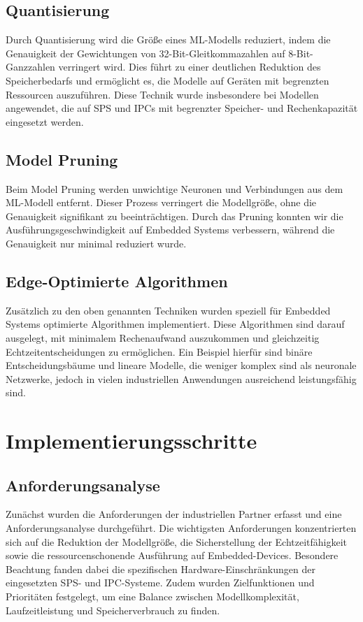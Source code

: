 \subsection{Quantisierung}
Durch Quantisierung wird die Größe eines ML-Modells reduziert, indem die Genauigkeit der Gewichtungen von 32-Bit-Gleitkommazahlen auf 8-Bit-Ganzzahlen verringert wird. 
Dies führt zu einer deutlichen Reduktion des Speicherbedarfs und ermöglicht es, die Modelle auf Geräten mit begrenzten Ressourcen auszuführen. 
Diese Technik wurde insbesondere bei Modellen angewendet, die auf SPS und IPCs mit begrenzter Speicher- und Rechenkapazität eingesetzt werden.

\subsection{Model Pruning}
Beim Model Pruning werden unwichtige Neuronen und Verbindungen aus dem ML-Modell entfernt. Dieser Prozess verringert die Modellgröße, ohne die Genauigkeit signifikant 
zu beeinträchtigen. Durch das Pruning konnten wir die Ausführungsgeschwindigkeit auf Embedded Systems verbessern, während die Genauigkeit nur minimal reduziert wurde.

\subsection{Edge-Optimierte Algorithmen}
Zusätzlich zu den oben genannten Techniken wurden speziell für Embedded Systems optimierte Algorithmen implementiert. Diese Algorithmen sind darauf ausgelegt, 
mit minimalem Rechenaufwand auszukommen und gleichzeitig Echtzeitentscheidungen zu ermöglichen. Ein Beispiel hierfür sind binäre Entscheidungsbäume und lineare Modelle, 
die weniger komplex sind als neuronale Netzwerke, jedoch in vielen industriellen Anwendungen ausreichend leistungsfähig sind.

\section{Implementierungsschritte}

\subsection{Anforderungsanalyse}
Zunächst wurden die Anforderungen der industriellen Partner erfasst und eine Anforderungsanalyse durchgeführt. Die wichtigsten Anforderungen konzentrierten sich auf 
die Reduktion der Modellgröße, die Sicherstellung der Echtzeitfähigkeit sowie die ressourcenschonende Ausführung auf Embedded-Devices. Besondere Beachtung fanden 
dabei die spezifischen Hardware-Einschränkungen der eingesetzten SPS- und IPC-Systeme. Zudem wurden Zielfunktionen und Prioritäten festgelegt, um eine Balance 
zwischen Modellkomplexität, Laufzeitleistung und Speicherverbrauch zu finden.

